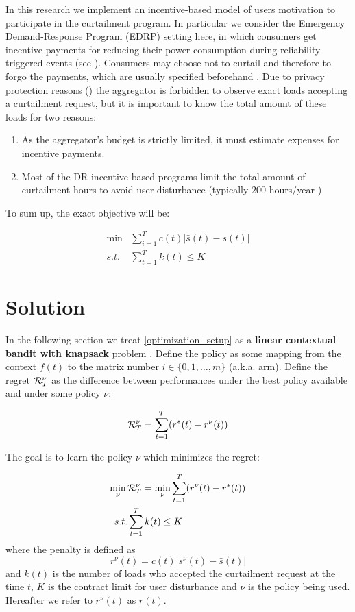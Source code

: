In this research we implement an incentive-based model of users motivation to participate in the curtailment program. In particular we consider the Emergency Demand-Response Program (EDRP) setting here, in which consumers get incentive payments for reducing their power consumption during reliability triggered events (see \cite{Aalami2010}). Consumers may choose not to curtail and therefore to forgo the payments, which are usually specified beforehand \cite{Vardakas2015}. Due to privacy protection reasons (\cite{Lisovich2010}) the aggregator is forbidden to observe exact loads accepting a curtailment request, but it is important to know the total amount of these loads for two reasons: 
    \begin{enumerate}
        \item As the aggregator's budget is strictly limited, it must estimate expenses for incentive payments. 
        \item Most of the DR incentive-based programs limit the total amount of curtailment hours to avoid user disturbance (typically 200 hours/year \cite{Aalami2010b})       
    \end{enumerate}
    
To sum up, the exact objective will be:

\begin{align}
    \label{optimization_setup}
    \min & \sum_{i=1}^T c(t) |{\bar s}(t) - s(t)| \\
    s.t. & \sum_{t=1}^T k(t) \leq K 
\end{align}

\section{Solution}
In the following section we treat \ref{optimization_setup} as a \textbf{linear contextual bandit with knapsack} problem \cite{Badanidiyuru2013}. Define the policy as some mapping from the context $f(t)$ to the matrix number $i \in \{0, 1, \dots, m\}$ (a.k.a. arm). Define the regret ${\cal R}^\nu_T$ as the difference between performances under the best policy available and under some policy $\nu$:

\begin{equation}
    \label{eq:regret_definition}
        {\cal R}^\nu_T = \sum_{t=1}^T(r^*(t) - r^{\nu}(t))
\end{equation}

The goal is to learn the policy $\nu$ which minimizes the regret:

\begin{equation}
    \begin{split}
    \min_{\nu}\, & {\cal R}^{\nu}_T = \min_{\nu} \sum_{t=1}^T(r^{\nu}(t) - r^*(t)) \\
     s.t. & \sum_{t=1}^T k(t) \leq K 
     \end{split}
\end{equation}
where the penalty is defined as
\[
    r^{\nu}(t) = c(t)|s^{\nu}(t) - {\bar s}(t)|
\]
and $k(t)$ is the number of loads who accepted the curtailment request at the time $t$, $K$ is the contract limit for user disturbance and $\nu$ is the policy being used. Hereafter we refer to $r^{\nu}(t)$ as $r(t)$.

